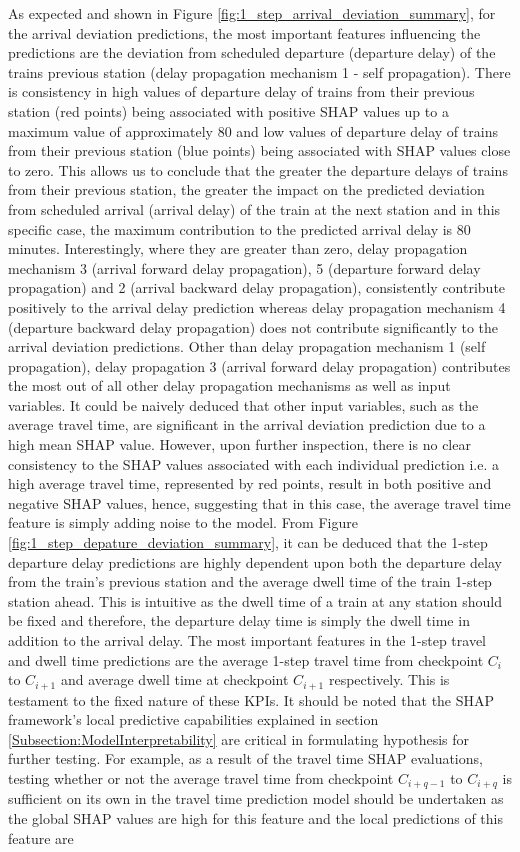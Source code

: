 \documentclass[]{interact}
\theoremstyle{plain}%
\theoremstyle{definition}
\theoremstyle{remark}
\begin{document}
As expected and shown in Figure \ref{fig:1_step_arrival_deviation_summary}, for the arrival deviation predictions, the most important features influencing the predictions are the deviation from scheduled departure (departure delay) of the trains previous station (delay propagation mechanism 1 - self propagation). There is consistency in high values of departure delay of trains from their previous station (red points) being associated with positive SHAP values up to a maximum value of approximately 80 and low values of departure delay of trains from their previous station (blue points) being associated with SHAP values close to zero. This allows us to conclude that the greater the departure delays of trains from their previous station, the greater the impact on the predicted deviation from scheduled arrival (arrival delay) of the train at the next station and in this specific case, the maximum contribution to the predicted arrival delay is 80 minutes. Interestingly, where they are greater than zero, delay propagation mechanism 3 (arrival forward delay propagation), 5 (departure forward delay propagation) and 2 (arrival backward delay propagation), consistently contribute positively to the arrival delay prediction whereas delay propagation mechanism 4 (departure backward delay propagation) does not contribute significantly to the arrival deviation predictions. Other than delay propagation mechanism 1 (self propagation), delay propagation 3 (arrival forward delay propagation) contributes the most out of all other delay propagation mechanisms as well as input variables. It could be naively deduced that other input variables, such as the average travel time, are significant in the arrival deviation prediction due to a high mean SHAP value. However, upon further inspection, there is no clear consistency to the SHAP values associated with each individual prediction i.e. a high average travel time, represented by red points, result in both positive and negative SHAP values, hence, suggesting that in this case, the average travel time feature is simply adding noise to the model. From Figure \ref{fig:1_step_depature_deviation_summary}, it can be deduced that the 1-step departure delay predictions are highly dependent upon both the departure delay from the train's previous station and the average dwell time of the train 1-step station ahead. This is intuitive as the dwell time of a train at any station should be fixed and therefore, the departure delay time is simply the dwell time in addition to the arrival delay. The most important features in the 1-step travel and dwell time predictions are the average 1-step travel time from checkpoint $C_i$ to $C_{i+1}$ and average dwell time at checkpoint $C_{i+1}$ respectively. This is testament to the fixed nature of these KPIs. It should be noted that the SHAP framework's local predictive capabilities explained in section \ref{Subsection:ModelInterpretability} are critical in formulating hypothesis for further testing. For example, as a result of the travel time SHAP evaluations, testing whether or not the average travel time from checkpoint $C_{i+q-1}$ to $C_{i+q}$ is sufficient on its own in the travel time prediction model should be undertaken as the global SHAP values are high for this feature and the local predictions of this feature are 
\end{document}
